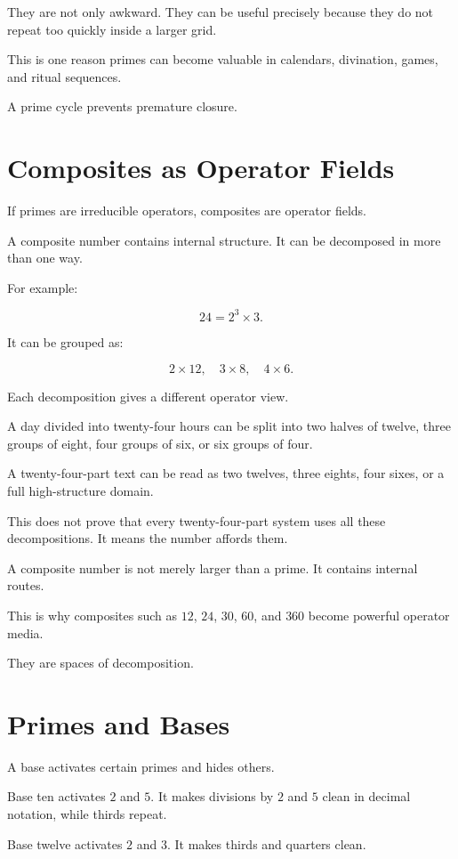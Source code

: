 \documentclass[11pt]{book}
\begin{document}
They are not only awkward. They can be useful precisely because they do not repeat too quickly inside a larger grid.

This is one reason primes can become valuable in calendars, divination, games, and ritual sequences.

A prime cycle prevents premature closure.

\section{Composites as Operator Fields}

If primes are irreducible operators, composites are operator fields.

A composite number contains internal structure. It can be decomposed in more than one way.

For example:

\[
24 = 2^3 \times 3.
\]

It can be grouped as:

\[
2 \times 12,
\quad
3 \times 8,
\quad
4 \times 6.
\]

Each decomposition gives a different operator view.

A day divided into twenty-four hours can be split into two halves of twelve, three groups of eight, four groups of six, or six groups of four.

A twenty-four-part text can be read as two twelves, three eights, four sixes, or a full high-structure domain.

This does not prove that every twenty-four-part system uses all these decompositions. It means the number affords them.

A composite number is not merely larger than a prime. It contains internal routes.

This is why composites such as \(12\), \(24\), \(30\), \(60\), and \(360\) become powerful operator media.

They are spaces of decomposition.

\section{Primes and Bases}

A base activates certain primes and hides others.

Base ten activates \(2\) and \(5\). It makes divisions by \(2\) and \(5\) clean in decimal notation, while thirds repeat.

Base twelve activates \(2\) and \(3\). It makes thirds and quarters clean.
\end{document}
